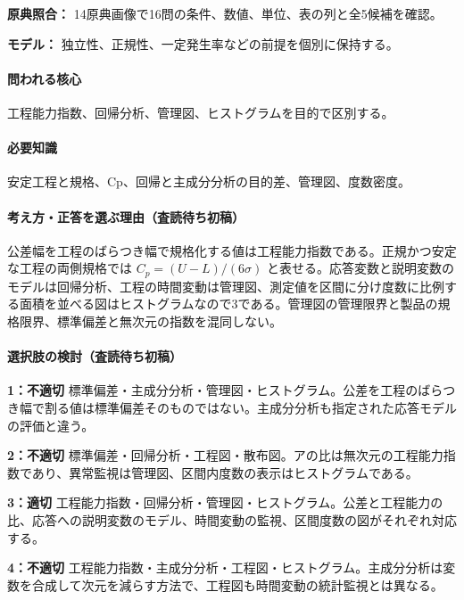 \noindent\textbf{原典照合：} 14原典画像で16問の条件、数値、単位、表の列と全5候補を確認。\par

\noindent\textbf{モデル：} 独立性、正規性、一定発生率などの前提を個別に保持する。\par

\paragraph{問われる核心} 工程能力指数、回帰分析、管理図、ヒストグラムを目的で区別する。

\paragraph{必要知識} 安定工程と規格、Cp、回帰と主成分分析の目的差、管理図、度数密度。

\paragraph{考え方・正答を選ぶ理由（査読待ち初稿）} 公差幅を工程のばらつき幅で規格化する値は工程能力指数である。正規かつ安定な工程の両側規格では \(C_p=(U-L)/(6\sigma)\) と表せる。応答変数と説明変数のモデルは回帰分析、工程の時間変動は管理図、測定値を区間に分け度数に比例する面積を並べる図はヒストグラムなので3である。管理図の管理限界と製品の規格限界、標準偏差と無次元の指数を混同しない。

\paragraph{選択肢の検討（査読待ち初稿）}\mbox{}\par

\noindent\textbf{1：不適切} 標準偏差・主成分分析・管理図・ヒストグラム。公差を工程のばらつき幅で割る値は標準偏差そのものではない。主成分分析も指定された応答モデルの評価と違う。\par

\noindent\textbf{2：不適切} 標準偏差・回帰分析・工程図・散布図。アの比は無次元の工程能力指数であり、異常監視は管理図、区間内度数の表示はヒストグラムである。\par

\noindent\textbf{3：適切} 工程能力指数・回帰分析・管理図・ヒストグラム。公差と工程能力の比、応答への説明変数のモデル、時間変動の監視、区間度数の図がそれぞれ対応する。\par

\noindent\textbf{4：不適切} 工程能力指数・主成分分析・工程図・ヒストグラム。主成分分析は変数を合成して次元を減らす方法で、工程図も時間変動の統計監視とは異なる。\par


